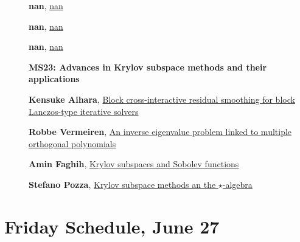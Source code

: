 \documentclass[ILAS2025-program.tex]{subfiles}
\begin{document}
\begin{description}
\begin{description}
        \item[] \hypertarget{up0388}{}\textbf{nan}, \hyperlink{down0388}{nan}
        \item[] \hypertarget{up0389}{}\textbf{nan}, \hyperlink{down0389}{nan}
        \item[] \hypertarget{up0390}{}\textbf{nan}, \hyperlink{down0390}{nan}
        \end{description}
    \begin{description}
    \item[] {\color{mstitle}\textbf{MS23: Advances in Krylov subspace methods and their applications}} 
    \item[] \hypertarget{up0391}{}\textbf{Kensuke Aihara}, \hyperlink{down0391}{Block cross-interactive residual smoothing for block Lanczos-type iterative solvers}
        \item[] \hypertarget{up0392}{}\textbf{Robbe Vermeiren}, \hyperlink{down0392}{An inverse eigenvalue problem linked to multiple orthogonal polynomials
}
        \item[] \hypertarget{up0393}{}\textbf{Amin Faghih}, \hyperlink{down0393}{Krylov subspaces and Sobolev functions}
        \item[] \hypertarget{up0394}{}\textbf{Stefano Pozza}, \hyperlink{down0394}{Krylov subspace methods an the $\star$-algebra}
        \end{description}
    \end{description}
    \newpage

\section{Friday Schedule, June 27}
    
\end{document}

